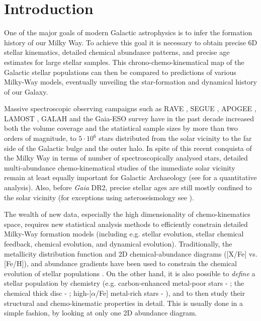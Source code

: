 \documentclass{aa}  %
\begin{document}
   \maketitle


\section{Introduction}

One of the major goals of modern Galactic astrophysics is to infer the formation history of our Milky Way. To achieve this goal it is necessary to obtain precise 6D stellar kinematics, detailed chemical abundance patterns, and precise age estimates for large stellar samples. This chrono-chemo-kinematical map of the Galactic stellar populations can then be compared to predictions of various Milky-Way models, eventually unveiling the star-formation and dynamical history of our Galaxy. 

Massive spectroscopic observing campaigns such as RAVE \citep{Steinmetz2006}, SEGUE \citep{Yanny2009}, APOGEE \citep{Majewski2017}, LAMOST \citep{Deng2012}, GALAH \citep{Martell2017} and the Gaia-ESO survey \citep{Gilmore2012} have in the past decade increased both the volume coverage and the statistical sample sizes by more than two orders of magnitude, to $5\cdot10^6$ stars distributed from the solar vicinity to the far side of the Galactic bulge and the outer halo. 
In spite of this recent conquista of the Milky Way in terms of number of spectroscopically analysed stars, detailed multi-abundance chemo-kinematical studies of the immediate solar vicinity \citep[e.g.]{Edvardsson1993, Fuhrmann1998, Fuhrmann2011, Fuhrmann2017, Adibekyan2012, Bensby2014, Nissen2015, Nissen2016, DelgadoMena2017} remain at least equally important for Galactic Archaeology (see \citealt{Lindegren2013} for a quantitative analysis). Also, before {\it Gaia} DR2, precise stellar ages are still mostly confined to the solar vicinity (for exceptions using asteroseismology see \citealt{Casagrande2016, Anders2017, Rodrigues2017, Miglio2017}).

The wealth of new data, especially the high dimensionality of chemo-kinematics space, requires new statistical analysis methods to efficiently constrain detailed Milky-Way formation models (including e.g. stellar evolution, stellar chemical feedback, chemical evolution, and dynamical evolution). Traditionally, the metallicity distribution function and 2D chemical-abundance diagrams ([X/Fe] vs. [Fe/H]), and abundance gradients have been used to constrain the chemical evolution of stellar populations \citep[e.g.][]{Pagel2009}. On the other hand, it is also possible to {\it define} a stellar population by chemistry (e.g. carbon-enhanced metal-poor stars - \citealt{Beers2005}; the chemical thick disc - \citealt{Gratton1996, Fuhrmann1998}; high-[$\alpha$/Fe] metal-rich stars - \citealt{Adibekyan2011}), and to then study their structural and chemo-kinematic properties in detail. This is usually done in a simple fashion, by looking at only one 2D abundance diagram. 
\end{document}
